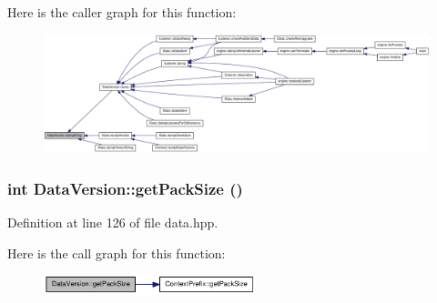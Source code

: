 Here is the caller graph for this function:\nopagebreak
\begin{figure}[H]
\begin{center}
\leavevmode
\includegraphics[width=420pt]{struct_data_version_a09ef74f4b532a991d2a05982d012d524_icgraph}
\end{center}
\end{figure}
\hypertarget{struct_data_version_a77899e6e8255693a00a56250c2d26572}{
\subsubsection[{getPackSize}]{\setlength{\rightskip}{0pt plus 5cm}int DataVersion::getPackSize ()}}
\label{struct_data_version_a77899e6e8255693a00a56250c2d26572}


Definition at line 126 of file data.hpp.

Here is the call graph for this function:\nopagebreak
\begin{figure}[H]
\begin{center}
\leavevmode
\includegraphics[width=175pt]{struct_data_version_a77899e6e8255693a00a56250c2d26572_cgraph}
\end{center}
\end{figure}


